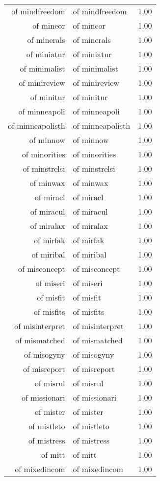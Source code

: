 \begin{table}[ht]
\begin{tabular}{rlr}
  of mindfreedom & of mindfreedom & 1.00 \\ 
  of mineor & of mineor & 1.00 \\ 
  of minerals & of minerals & 1.00 \\ 
  of miniatur & of miniatur & 1.00 \\ 
  of minimalist & of minimalist & 1.00 \\ 
  of minireview & of minireview & 1.00 \\ 
  of minitur & of minitur & 1.00 \\ 
  of minneapoli & of minneapoli & 1.00 \\ 
  of minneapolisth & of minneapolisth & 1.00 \\ 
  of minnow & of minnow & 1.00 \\ 
  of minorities & of minorities & 1.00 \\ 
  of minstrelsi & of minstrelsi & 1.00 \\ 
  of minwax & of minwax & 1.00 \\ 
  of miracl & of miracl & 1.00 \\ 
  of miracul & of miracul & 1.00 \\ 
  of miralax & of miralax & 1.00 \\ 
  of mirfak & of mirfak & 1.00 \\ 
  of miribal & of miribal & 1.00 \\ 
  of misconcept & of misconcept & 1.00 \\ 
  of miseri & of miseri & 1.00 \\ 
  of misfit & of misfit & 1.00 \\ 
  of misfits & of misfits & 1.00 \\ 
  of misinterpret & of misinterpret & 1.00 \\ 
  of mismatched & of mismatched & 1.00 \\ 
  of misogyny & of misogyny & 1.00 \\ 
  of misreport & of misreport & 1.00 \\ 
  of misrul & of misrul & 1.00 \\ 
  of missionari & of missionari & 1.00 \\ 
  of mister & of mister & 1.00 \\ 
  of mistleto & of mistleto & 1.00 \\ 
  of mistress & of mistress & 1.00 \\ 
  of mitt & of mitt & 1.00 \\ 
  of mixedincom & of mixedincom & 1.00 \\ 

\end{tabular}
\end{table}
